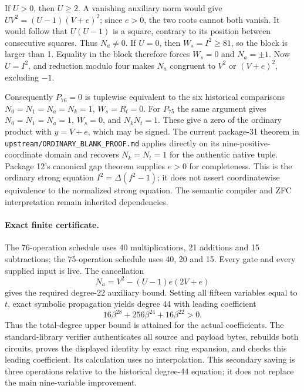 If $U>0$, then $U\geq2$. A vanishing auxiliary norm would give
$UV^2=(U-1)(V+e)^2$; since $e>0$, the two roots cannot both vanish.
It would follow that $U(U-1)$ is a square, contrary to its position
between consecutive squares. Thus $N_a\ne0$. If $U=0$, then
$W_s=I^2\geq81$, so the block is larger than 1.
Equality in the block therefore forces $W_s=0$ and $N_a=\pm1$.
Now $U=I^2$, and reduction modulo four makes $N_a$ congruent to
$V^2$ or $(V+e)^2$, excluding $-1$.

Consequently $P_{76}=0$ is tuplewise equivalent to the six historical
comparisons $N_0=N_1=N_a=N_k=1$, $W_s=R_t=0$.
For $P_{75}$ the same argument gives $N_0=N_1=N_a=1$, $W_s=0$,
and $N_kN_t=1$. These give a zero of the ordinary product with
$y=V+e$, which may be signed. The current package-31 theorem in
\texttt{upstream/ORDINARY\_BLANK\_PROOF.md} applies directly on its
nine-positive-coordinate domain and recovers $N_k=N_t=1$
for the authentic native tuple. Package 12's canonical gap theorem
supplies $e>0$ for completeness. This is the ordinary strong equation
$I^2=\Delta(f^2-1)$; it does not assert coordinatewise equivalence
to the normalized strong equation. The semantic compiler and ZFC
interpretation remain inherited dependencies.

\paragraph{Exact finite certificate.}
The 76-operation schedule uses 40 multiplications, 21 additions and
15 subtractions; the 75-operation schedule uses 40, 20 and 15.
Every gate and every supplied input is live. The cancellation
\[
 N_a=V^2-(U-1)e(2V+e)
\]
gives the required degree-22 auxiliary bound. Setting all fifteen
variables equal to $t$, exact symbolic propagation yields degree 44
with leading coefficient
\[
 16\beta^{28}+256\beta^{24}+16\beta^{22}>0.
\]
Thus the total-degree upper bound is attained for the actual coefficients.
The standard-library verifier authenticates all source and payload bytes,
rebuilds both circuits, proves the displayed identity by exact ring
expansion, and checks this leading coefficient. Its calculation uses no
interpolation. This secondary saving is three operations relative to
the historical degree-44 equation; it does not replace the main
nine-variable improvement.
